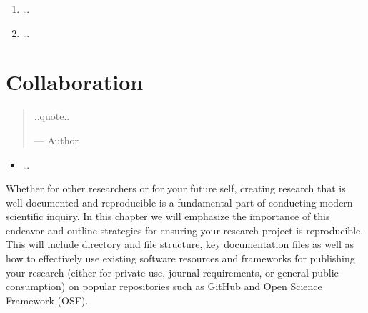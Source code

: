 \documentclass[
  letterpaper,
]{latex/krantz}
\providecommand{\tightlist}{%
  \setlength{\itemsep}{0pt}\setlength{\parskip}{0pt}}\usepackage{longtable,booktabs,array}
\begin{document}
\begin{tcolorbox}[enhanced jigsaw, colbacktitle=quarto-callout-note-color!10!white, arc=.35mm, toprule=.15mm, breakable, colframe=quarto-callout-note-color-frame, bottomrule=.15mm, opacitybacktitle=0.6, coltitle=black, titlerule=0mm, colback=white, toptitle=1mm, bottomtitle=1mm, title=\textcolor{quarto-callout-note-color}{\faInfo}\hspace{0.5em}{Technical exercises}, rightrule=.15mm, leftrule=.75mm, opacityback=0, left=2mm]

\begin{enumerate}
\def\labelenumi{\arabic{enumi}.}
\tightlist
\item
  \ldots{}
\item
  \ldots{}
\end{enumerate}

\end{tcolorbox}

\hypertarget{sec-collaboration}{%
\chapter{Collaboration}\label{sec-collaboration}}

\begin{quote}
..quote..

--- Author
\end{quote}

\begin{tcolorbox}[enhanced jigsaw, colbacktitle=quarto-callout-note-color!10!white, arc=.35mm, toprule=.15mm, breakable, colframe=quarto-callout-note-color-frame, bottomrule=.15mm, opacitybacktitle=0.6, coltitle=black, titlerule=0mm, colback=white, toptitle=1mm, bottomtitle=1mm, title=\textcolor{quarto-callout-note-color}{\faInfo}\hspace{0.5em}{Keys}, rightrule=.15mm, leftrule=.75mm, opacityback=0, left=2mm]

\begin{itemize}
\tightlist
\item
  \ldots{}
\end{itemize}

\end{tcolorbox}

Whether for other researchers or for your future self, creating research
that is well-documented and reproducible is a fundamental part of
conducting modern scientific inquiry. In this chapter we will emphasize
the importance of this endeavor and outline strategies for ensuring your
research project is reproducible. This will include directory and file
structure, key documentation files as well as how to effectively use
existing software resources and frameworks for publishing your research
(either for private use, journal requirements, or general public
consumption) on popular repositories such as GitHub and Open Science
Framework (OSF).
\end{document}
